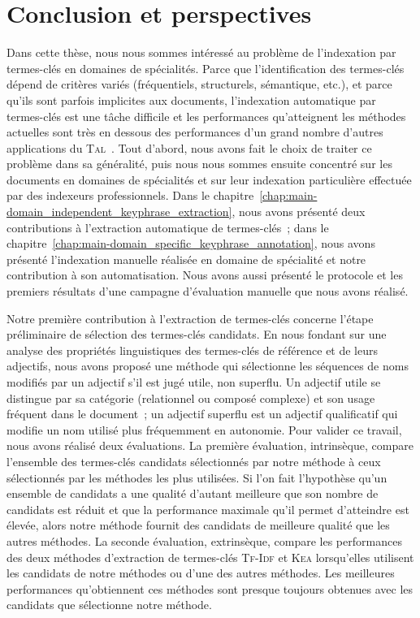 \chapter{Conclusion et perspectives}
\label{chap:main-conclusion}

  Dans cette thèse, nous nous sommes intéressé au problème de l'indexation par
  termes-clés en domaines de spécialités. Parce que l'identification des
  termes-clés dépend de critères variés (fréquentiels, structurels, sémantique,
  etc.), et parce qu'ils sont parfois implicites aux documents, l'indexation
  automatique par termes-clés est une tâche difficile et les performances
  qu'atteignent les méthodes actuelles sont très en dessous des performances
  d'un grand nombre d'autres applications du
  \textsc{Tal}~\cite{hasan2014state_of_the_art}. Tout d'abord, nous avons fait
  le choix de traiter ce problème dans sa généralité, puis nous nous sommes
  ensuite concentré sur les documents en domaines de spécialités et sur leur
  indexation particulière effectuée par des indexeurs professionnels. Dans le
  chapitre~\ref{chap:main-domain_independent_keyphrase_extraction}, nous avons
  présenté deux contributions à l'extraction automatique de termes-clés~; dans
  le chapitre~\ref{chap:main-domain_specific_keyphrase_annotation}, nous avons
  présenté l'indexation manuelle réalisée en domaine de spécialité et notre
  contribution à son automatisation. Nous avons aussi présenté le protocole et
  les premiers résultats d'une campagne d'évaluation manuelle que nous avons
  réalisé.

  Notre première contribution à l'extraction de termes-clés concerne l'étape
  préliminaire de sélection des termes-clés candidats. En nous fondant sur une
  analyse des propriétés linguistiques des termes-clés de référence et de leurs
  adjectifs, nous avons proposé une méthode qui sélectionne les séquences de
  noms modifiés par un adjectif s'il est jugé utile, non superflu. Un adjectif
  utile se distingue par sa catégorie (relationnel ou composé complexe) et son
  usage fréquent dans le document~; un adjectif superflu est un adjectif
  qualificatif qui modifie un nom utilisé plus fréquemment en autonomie. Pour
  valider ce travail, nous avons réalisé deux évaluations. La première
  évaluation, intrinsèque, compare l'ensemble des termes-clés candidats
  sélectionnés par notre méthode à ceux sélectionnés par les méthodes les plus
  utilisées. Si l'on fait l'hypothèse qu'un ensemble de candidats a une qualité
  d'autant meilleure que son nombre de candidats est réduit et que la
  performance maximale qu'il permet d'atteindre est élevée, alors notre méthode
  fournit des candidats de meilleure qualité que les autres méthodes. La seconde
  évaluation, extrinsèque, compare les performances des deux méthodes
  d'extraction de termes-clés \textsc{Tf-Idf} et \textsc{Kea} lorsqu'elles
  utilisent les candidats de notre méthodes ou d'une des autres méthodes. Les
  meilleures performances qu'obtiennent ces méthodes sont presque toujours
  obtenues avec les candidats que sélectionne notre méthode.


